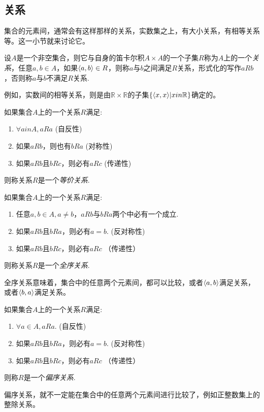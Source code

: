 \subsection{关系}
\label{sec:relation}

集合的元素间，通常会有这样那样的关系，实数集之上，有大小关系，有相等关系等。这一小节就来讨论它。

\begin{definition}
  设$A$是一个非空集合，则它与自身的笛卡尔积$A\times A$的一个子集$R$称为$A$上的一个\emph{关系}，任意$a,b \in A$，如果$\langle a, b \rangle \in R$，则称$a$与$b$之间满足$R$关系，形式化的写作$aRb$，否则称$a$与$b$不满足$R$关系.
\end{definition}

例如，实数间的相等关系，则是由$\mathbb{R} \times \mathbb{R}$的子集$\{\langle x, x \rangle | x in \mathbb{R}\}$确定的。

\begin{definition}
  如果集合$A$上的一个关系$R$满足:
  \begin{enumerate}
  \item $\forall a in A, aRa$ (自反性)
  \item 如果$aRb$，则也有$bRa$ (对称性)
  \item 如果$aRb$且$bRc$，则必有$aRc$ (传递性)
  \end{enumerate}
  则称关系$R$是一个\emph{等价关系}.
\end{definition}

\begin{definition}
  如果集合$A$上的一个关系$R$满足:
  \begin{enumerate}
  \item 任意$a,b \in A,a\neq b$，$aRb$与$bRa$两个中必有一个成立.
  \item 如果$aRb$且$bRa$，则必有$a=b$. (反对称性)
  \item 如果$aRb$且$bRc$，则必有$aRc$ （传递性）
  \end{enumerate}
  则称关系$R$是一个\emph{全序关系}.
\end{definition}
全序关系意味着，集合中的任意两个元素间，都可以比较，或者$\langle a, b \rangle$满足关系，或者$\langle b, a \rangle$满足关系。

\begin{definition}
  如果集合$A$上的一个关系$R$满足:
  \begin{enumerate}
  \item $\forall a \in A, aRa$. (自反性)
  \item 如果$aRb$且$bRa$，则必有$a=b$. (反对称性)
  \item 如果$aRb$且$bRc$，则必有$aRc$ （传递性）
  \end{enumerate}
  则称$R$是一个\emph{偏序关系}.
\end{definition}
偏序关系，就不一定能在集合中的任意两个元素间进行比较了，例如正整数集上的整除关系。

